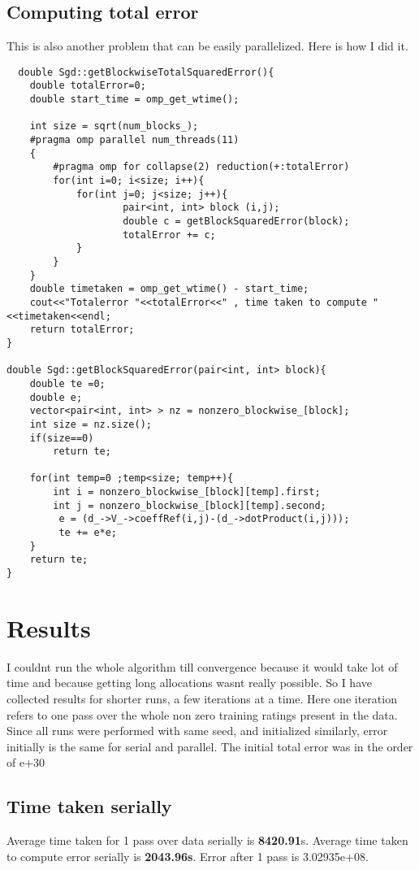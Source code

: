 \documentclass[a4paper,11pt]{article}
\begin{document}
\subsection{Computing total error}
This is also another problem that can be easily parallelized. Here is how I did it. 
\begin{lstlisting}
  double Sgd::getBlockwiseTotalSquaredError(){
	double totalError=0;
	double start_time = omp_get_wtime();
	
	int size = sqrt(num_blocks_);
	#pragma omp parallel num_threads(11) 
	{
		#pragma omp for collapse(2) reduction(+:totalError)
		for(int i=0; i<size; i++){
			for(int j=0; j<size; j++){
					pair<int, int> block (i,j);
    				double c = getBlockSquaredError(block);
    				totalError += c;
			}
		}
	}
	double timetaken = omp_get_wtime() - start_time;
	cout<<"Totalerror "<<totalError<<" , time taken to compute "<<timetaken<<endl;
	return totalError;
}

double Sgd::getBlockSquaredError(pair<int, int> block){
    double te =0;
    double e;
    vector<pair<int, int> > nz = nonzero_blockwise_[block];
    int size = nz.size();
	if(size==0)
		return te;
	
    for(int temp=0 ;temp<size; temp++){
    	int i = nonzero_blockwise_[block][temp].first;
    	int j = nonzero_blockwise_[block][temp].second;
    	 e = (d_->V_->coeffRef(i,j)-(d_->dotProduct(i,j)));
    	 te += e*e;
    }	 
    return te;
}

\end{lstlisting}
\section{Results}
I couldnt run the whole algorithm till convergence because it would take lot of time and because getting long allocations wasnt really possible. So I have collected results for shorter runs, a few iterations at a time. Here one iteration refers to one pass over the whole non zero training ratings present in the data. Since all runs were performed with same seed, and initialized similarly, error initially is the same for serial and parallel. The initial total error was in the order of e+30
\subsection{Time taken serially}
Average time taken for 1 pass over data serially is \textbf{8420.91}s.
Average time taken to compute error serially is \textbf{2043.96s}.
Error after 1 pass is 3.02935e+08.
\end{document}

